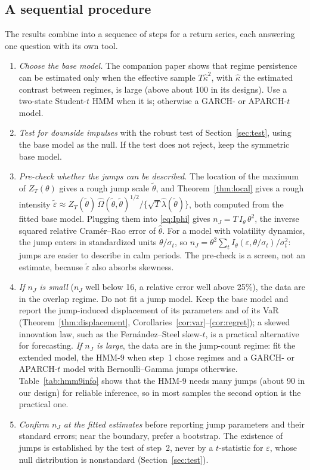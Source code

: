 \documentclass[11pt,a4paper]{article}
\theoremstyle{definition}
\theoremstyle{remark}
\begin{document}
\subsection{A sequential procedure}\label{sec:procedure}
The results combine into a sequence of steps for a return series, each answering one question with its own tool.
\begin{enumerate}[itemsep=2pt]
\item \emph{Choose the base model.} The companion paper \citet{giornoA} shows that regime persistence can be estimated only when the effective sample $T\hat\kappa^2$, with $\hat\kappa$ the estimated contrast between regimes, is large (above about 100 in its designs). Use a two-state Student-$t$ HMM when it is; otherwise a GARCH- or APARCH-$t$ model.
\item \emph{Test for downside impulses} with the robust test of Section~\ref{sec:test}, using the base model as the null. If the test does not reject, keep the symmetric base model.
\item \emph{Pre-check whether the jumps can be described.} The location of the maximum of $Z_T(\theta)$ gives a rough jump scale $\tilde\theta$, and Theorem~\ref{thm:local} gives a rough intensity $\tilde\varepsilon\approx Z_T(\tilde\theta)\,\hat\Omega(\tilde\theta,\tilde\theta)^{1/2}/\{\sqrt T\hat\lambda(\tilde\theta)\}$, both computed from the fitted base model. Plugging them into \eqref{eq:Iphi} gives $n_J=T\,I_\theta\,\theta^2$, the inverse squared relative Cram\'er--Rao error of $\hat\theta$. For a model with volatility dynamics, the jump enters in standardized units $\theta/\sigma_t$, so $n_J=\theta^2\sum_tI_\theta(\varepsilon,\theta/\sigma_t)/\sigma_t^2$: jumps are easier to describe in calm periods. The pre-check is a screen, not an estimate, because $\tilde\varepsilon$ also absorbs skewness.
\item \emph{If $n_J$ is small} ($n_J$ well below 16, a relative error well above 25\%), the data are in the overlap regime. Do not fit a jump model. Keep the base model and report the jump-induced displacement of its parameters and of its VaR (Theorem~\ref{thm:displacement}, Corollaries~\ref{cor:var}--\ref{cor:regret}); a skewed innovation law, such as the Fern\'andez--Steel skew-$t$, is a practical alternative for forecasting. \emph{If $n_J$ is large}, the data are in the jump-count regime: fit the extended model, the HMM-9 when step~1 chose regimes and a GARCH- or APARCH-$t$ model with Bernoulli--Gamma jumps otherwise. Table~\ref{tab:hmm9info} shows that the HMM-9 needs many jumps (about 90 in our design) for reliable inference, so in most samples the second option is the practical one.
\item \emph{Confirm $n_J$ at the fitted estimates} before reporting jump parameters and their standard errors; near the boundary, prefer a bootstrap. The existence of jumps is established by the test of step~2, never by a $t$-statistic for $\varepsilon$, whose null distribution is nonstandard (Section~\ref{sec:test}).
\end{enumerate}
\end{document}
